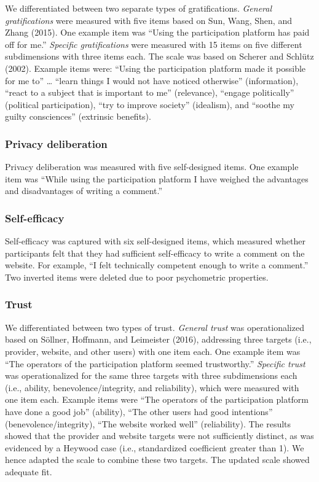 \documentclass[
  english,
  man,floatsintext]{apa6}
\begin{document}
We differentiated between two separate types of gratifications.
\emph{General gratifications} were measured with five items based on Sun, Wang, Shen, and Zhang (2015).
One example item was ``Using the participation platform has paid off for me.''
\emph{Specific gratifications} were measured with 15 items on five different subdimensions with three items each.
The scale was based on Scherer and Schlütz (2002).
Example items were: ``Using the participation platform made it possible for me to'' \ldots{} ``learn things I would not have noticed otherwise'' (information), ``react to a subject that is important to me'' (relevance), ``engage politically'' (political participation), ``try to improve society'' (idealism), and ``soothe my guilty consciences'' (extrinsic benefits).

\hypertarget{privacy-deliberation}{%
\subsubsection{Privacy deliberation}\label{privacy-deliberation}}

Privacy deliberation was measured with five self-designed items. One example item was ``While using the participation platform I have weighed the advantages and disadvantages of writing a comment.''

\hypertarget{self-efficacy}{%
\subsubsection{Self-efficacy}\label{self-efficacy}}

Self-efficacy was captured with six self-designed items, which measured whether participants felt that they had sufficient self-efficacy to write a comment on the website.
For example, ``I felt technically competent enough to write a comment.''
Two inverted items were deleted due to poor psychometric properties.

\hypertarget{trust}{%
\subsubsection{Trust}\label{trust}}

We differentiated between two types of trust.
\emph{General trust} was operationalized based on Söllner, Hoffmann, and Leimeister (2016), addressing three targets (i.e., provider, website, and other users) with one item each.
One example item was ``The operators of the participation platform seemed trustworthy.''
\emph{Specific trust} was operationalized for the same three targets with three subdimensions each (i.e., ability, benevolence/integrity, and reliability), which were measured with one item each.
Example items were ``The operators of the participation platform have done a good job'' (ability), ``The other users had good intentions'' (benevolence/integrity), ``The website worked well'' (reliability).
The results showed that the provider and website targets were not sufficiently distinct, as was evidenced by a Heywood case (i.e., standardized coefficient greater than 1).
We hence adapted the scale to combine these two targets.
The updated scale showed adequate fit.
\end{document}
